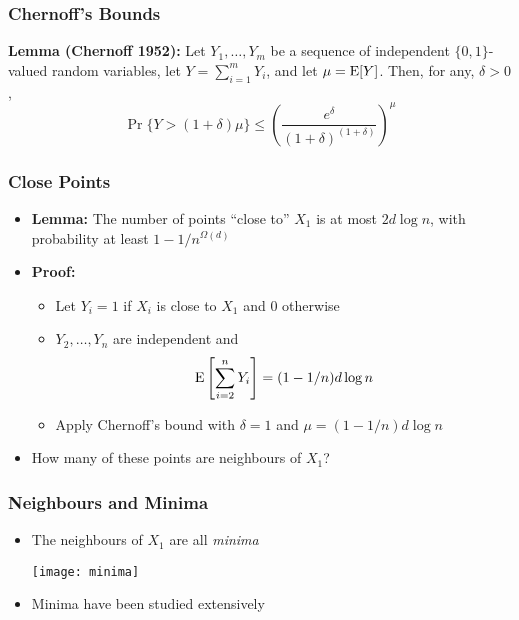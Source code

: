 \documentclass{beamer}
\begin{document}
\frame
{
  \frametitle{Chernoff's Bounds}

    \textbf{Lemma (Chernoff 1952):}
    Let $Y_1,\ldots,Y_m$ be a sequence of independent $\{0,1\}$-valued
    random variables, let $Y=\sum_{i=1}^m Y_i$, and let $\mu=\mathrm{E}[Y]$.
    Then, for any, $\delta > 0$,
    \[
       \Pr\{Y > (1+\delta)\mu\} 
         \le \left(\frac{e^{\delta}}{(1+\delta)^{(1+\delta)}}\right)^{\mu}
    \]
}

\frame
{
  \frametitle{Close Points}


   \begin{itemize}
     \item
       \textbf{Lemma:} The number of points ``close to'' $X_1$ is at most
$2d\log n$, with probability at least $1-1/n^{\Omega(d)}$

     \item \textbf{Proof:}
       \begin{itemize}
         \item Let $Y_i=1$ if $X_i$ is close to $X_1$ and 0 otherwise
         \item $Y_2,\ldots,Y_n$ are independent and
             \[ \mathrm{E}\left[\sum_{i=2}^n Y_i\right] = (1-1/n)d\log n \]
         \item Apply Chernoff's bound with $\delta=1$ and $\mu=(1-1/n)d\log n$ 
       \end{itemize}
     \item How many of these points are neighbours of $X_1$?
     \end{itemize}
}

\frame
{
  \frametitle{Neighbours and Minima}

   \begin{itemize}
     \item The neighbours of $X_1$ are all \emph{minima}
      \begin{center}
        \texttt{[image: minima]}
      \end{center}
     \item Minima have been studied extensively
   \end{itemize}

}
\end{document}
